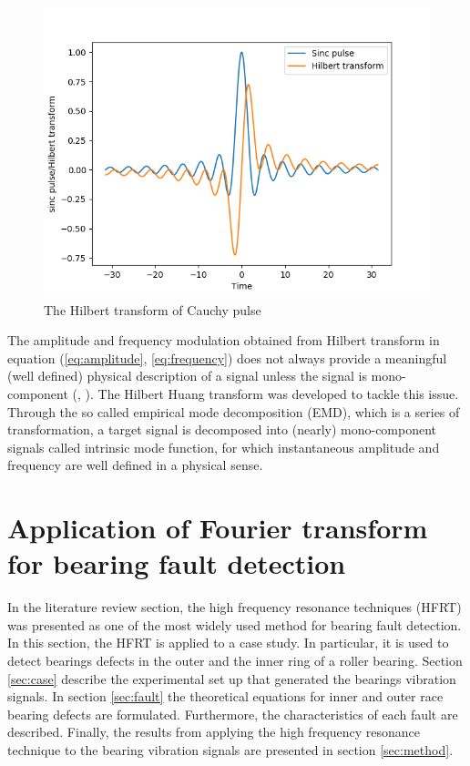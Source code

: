 \documentclass[../Main/thesis.tex]{subfiles}
\begin{document}
\begin{figure}[H]
	\centering
	\includegraphics[width=0.8\linewidth]{../fig/sinc_pulse}
	\caption{The Hilbert transform of Cauchy pulse }
	\label{fig:sinc_pulse}
\end{figure}
\justify
The amplitude and frequency modulation obtained from Hilbert transform in equation (\ref{eq:amplitude}, \ref{eq:frequency}) does not always provide a meaningful (well defined) physical description of a signal unless the signal is mono-component (\cite{huang98}, \cite{huang08}). The Hilbert Huang transform was developed to tackle this issue. Through the so called empirical mode decomposition (EMD), which is a series of transformation, a target signal is decomposed into (nearly) mono-component signals called intrinsic mode function, for which instantaneous amplitude and frequency are well defined in a physical sense.





\clearpage


\section{Application of Fourier transform for bearing fault detection}
\label{sec:application}
In the literature review section, the high frequency resonance techniques (HFRT) was presented as one of the most widely used method for bearing fault detection. In this section, the HFRT is applied to a case study. In particular, it is used to detect bearings defects in the outer and the inner ring of a roller bearing.
\justify
Section \ref{sec:case} describe the experimental set up that generated the bearings vibration signals. In section \ref{sec:fault} the theoretical equations for inner and outer race bearing defects are formulated. Furthermore, the characteristics of each fault are described.
Finally, the results from applying the high frequency resonance technique to the bearing vibration signals are presented in section \ref{sec:method}.
\end{document}
